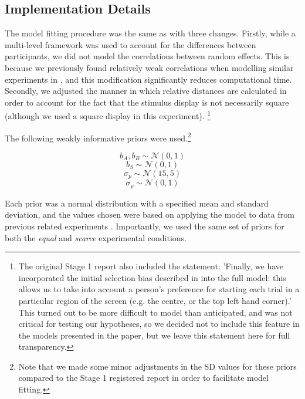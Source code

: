\documentclass[12pt]{article}
\begin{document}
\subsection{Implementation Details}
\label{sec_implementation}

The model fitting procedure was the same as \cite{clarke2022foraging} with three changes. Firstly, while a multi-level framework was used to account for the differences between participants, we did not model the correlations between random effects. This is because we previously found relatively weak correlations when modelling similar experiments in \cite{clarke2022foraging}, and this modification  significantly reduces computational time. Secondly, we adjusted the manner in which relative distances are calculated in order to account for the fact that the stimulus display is not necessarily square (although we used a square display in this experiment). \footnote{The original Stage 1 report also included the statement: 'Finally, we have incorporated the initial selection bias described in \cite{clarke2022bayesian} into the full model: this allows us to take into account a person's preference for starting each trial in a particular region of the screen (e.g. the centre, or the top left hand corner).' This turned out to be more difficult to model than anticipated, and was not critical for testing our hypotheses, so we decided not to include this feature in the models presented in the paper, but we leave this statement here for full transparency.}

The following weakly informative priors were used.\footnote{Note that we made some minor adjustments in the SD values for these priors compared to the Stage 1 registered report in order to facilitate model fitting.}

\begin{equation}
    b_A, b_B \sim \mathcal{N}(0, 1)
\end{equation}  
\begin{equation}
    b_S \sim \mathcal{N}(0, 1)
\end{equation}
\begin{equation}
    \sigma_p \sim \mathcal{N}(15, 5)
\end{equation}
\begin{equation}
    \sigma_{\rho} \sim \mathcal{N}(0, 1)
\end{equation}

Each prior was a normal distribution with a specified mean and standard deviation, and the values chosen were based on applying the model to data from previous related experiments \citep{clarke2022foraging}.   Importantly, we used the same set of priors for both the \textit{equal} and \textit{scarce} experimental conditions. 
\end{document}
